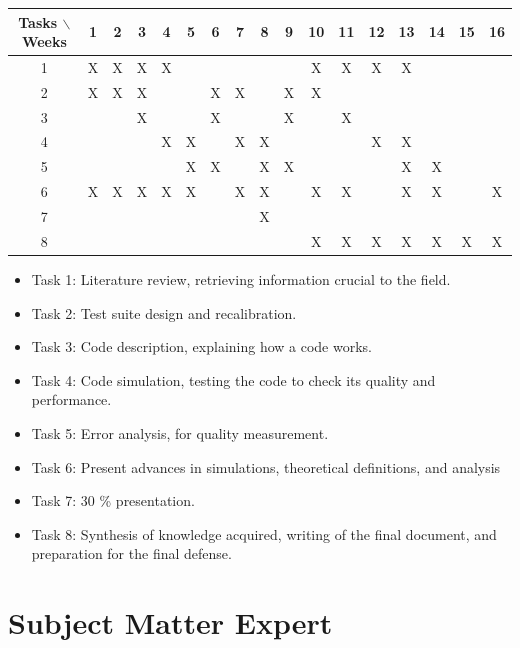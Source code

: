 \documentclass[12pt]{article}
\begin{document}
\begin{table}[H]
  \begin{tabular}{|c|cccccccccccccccc| }
    \hline
    Tasks $\backslash$ Weeks & 1 & 2 & 3 & 4 & 5 & 6 & 7 & 8 & 9 & 10 & 11 & 12 & 13 & 14 & 15 & 16  \\
    \hline
    1 & X & X & X & X &   &   &   &   &   & X & X & X & X &   &   &   \\
    2 & X & X & X &   &   & X & X &   & X & X &   &   &   &   &   &   \\
    3 &   &   & X &   &   & X &   &   & X &   & X &   &   &   &   &   \\
    4 &   &   &   & X & X &   & X & X &   &   &   & X & X &   &   &   \\
    5 &   &   &   &   & X & X &   & X & X &   &   &   & X & X &   &   \\
    6 & X & X & X & X & X &   & X & X &   & X & X &   & X & X &   & X  \\
    7 &   &   &   &   &   &   &   & X &   &   &   &   &   &   &   &   \\
    8 &   &   &   &   &   &   &   &   &   & X & X & X & X & X & X & X \\
    \hline
  \end{tabular}
\end{table}
\vspace{1mm}
\begin{itemize}
\item Task 1: Literature review, retrieving information crucial to the field.
\item Task 2: Test suite design and recalibration.
\item Task 3: Code description, explaining how a code works.
\item Task 4: Code simulation, testing the code to check its quality and performance.
\item Task 5: Error analysis, for quality measurement.
\item Task 6: Present advances in simulations, theoretical definitions, and analysis
\item Task 7: 30 \% presentation.
\item Task 8: Synthesis of knowledge acquired, writing of the final document, and preparation for the final defense.
\end{itemize}


\section{Subject Matter Expert}
\end{document}
